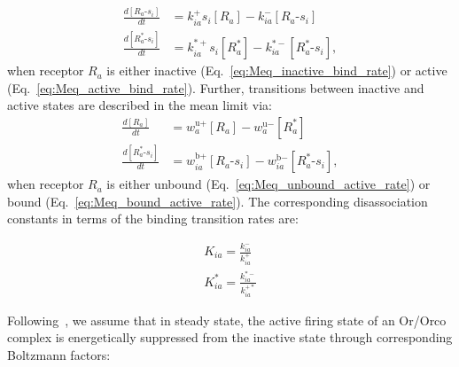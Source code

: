 \begin{align}
\frac{d[R_a\text{-}s_i]}{dt} &= k^+_{ia}s_i[R_a] - k^-_{ia}[R_a\text{-}s_i] \label{eq:Meq_inactive_bind_rate}\\
\frac{d[R^*_a\text{-}s_i]}{dt} &= k^{*+}_{ia}s_i[R^*_a] - k^{*-}_{ia}[R^*_a\text{-}s_i],
\label{eq:Meq_active_bind_rate}
\end{align}
when receptor $R_a$ is either inactive (Eq.~\ref{eq:Meq_inactive_bind_rate}) or active (Eq.~\ref{eq:Meq_active_bind_rate}). Further, transitions between inactive and active states are described in the mean limit via:
\begin{align}
\frac{d[R_a]}{dt} &= w^{\text{u}+}_a [R_a] - w^{\text{u}-}_a [R^*_a] \label{eq:Meq_unbound_active_rate}\\
\frac{d[R^*_a\text{-}s_i]}{dt} &=  w^{\text{b}+}_{ia} [R_a\text{-}s_i] - w^{\text{b}-}_{ia}  [R^*_a\text{-}s_i],
\label{eq:Meq_bound_active_rate}
\end{align}
when receptor $R_a$ is either unbound (Eq.~\ref{eq:Meq_unbound_active_rate}) or bound (Eq.~\ref{eq:Meq_bound_active_rate}). The corresponding disassociation constants in terms of the binding transition rates are:


\begin{align}
K_{ia} = \frac{k^-_{ia}}{k^+_{ia}} \nonumber \\
K^*_{ia} = \frac{k^{*-}_{ia}}{k^{+*}_{ia}} 
\label{eq:Kd}
\end{align}

Following~\cite{srinivas_elife}, we assume that in steady state, the active firing state of an Or/Orco complex is energetically suppressed from the inactive state through corresponding Boltzmann factors:

